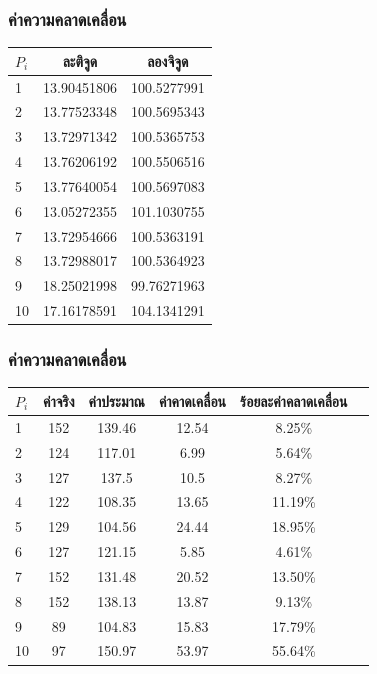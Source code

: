 \documentclass[12pt,aspectratio=169]{beamer}
\begin{document}
\begin{frame}
    \frametitle{ค่าความคลาดเคลื่อน}
\begin{center}
    \begin{tabular}{lcc} 
        \hline
        $P_i$ & ละติจูด & ลองจิจูด \\
        \hline
        1 & 13.90451806 & 100.5277991   \\
        2 & 13.77523348 & 100.5695343  \\
        3 & 13.72971342 & 100.5365753 \\
        4 & 13.76206192 & 100.5506516  \\
        5 & 13.77640054 & 100.5697083\\
        6 & 13.05272355 & 101.1030755\\
        7 & 13.72954666 & 100.5363191 \\
        8 & 13.72988017 & 100.5364923 \\
        9 & 18.25021998 & 99.76271963\\
        10 & 17.16178591 & 104.1341291 \\
        \hline
        \end{tabular}
    \end{center}
\end{frame}

\begin{frame}
    \frametitle{ค่าความคลาดเคลื่อน}
        \begin{center}
        \begin{tabular}{lccccc} 
        \hline
        $P_i$ & ค่าจริง &ค่าประมาณ &  ค่าคาดเคลื่อน & ร้อยละค่าคลาดเคลื่อน\\
        \hline
        1 & 152 & 139.46   &12.54 &8.25\% \\
        2 &124 & 117.01   &6.99  &5.64\% \\
        3  &127   & 137.5   &10.5  &8.27\% \\
        4  &122  & 108.35   &13.65 &11.19\% \\
        5 &129 & 104.56   &24.44 &18.95\% \\
        6  &127  & 121.15   &5.85  &4.61\% \\
        7&152 & 131.48   &20.52 &13.50\% \\
        8  &152 & 138.13   &13.87 &9.13\% \\
        9 &89 & 104.83   &15.83 &17.79\% \\
        10 &97 & 150.97   &53.97 &55.64\% \\
        \hline
        \end{tabular}
    \end{center}
\end{frame}
\end{document}
